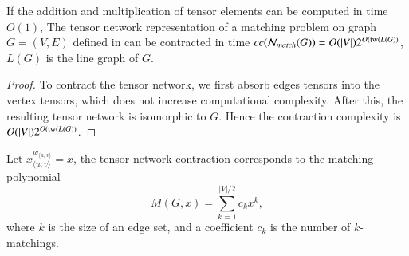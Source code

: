 \documentclass[review, onefignum, onetabnum]{siamart190516}
\begin{document}
\begin{theorem}\label{thm:matchcomplex}
    If the addition and multiplication of tensor elements can be computed in time $O(1)$,
    The tensor network representation of a matching problem on graph $G=(V,E)$ defined in  can be contracted in time $cc(\mathcal{N}_{match}(G)) = O(|V|)2^{O({\rm tw}(L(G))}$, $L(G)$ is the line graph of $G$.
\end{theorem}
\begin{proof}
    To contract the tensor network, we first absorb edges tensors into the vertex tensors, which does not increase computational complexity.
    After this, the resulting tensor network is isomorphic to $G$.
    Hence the contraction complexity is $O(|V|)2^{O({\rm tw}(L(G))}$.
\end{proof}
Let $x_{\langle u,v\rangle}^{w_{\langle u,v\rangle}}=x$, the tensor network contraction corresponds to the matching polynomial
\begin{equation}
    M(G, x) = \sum\limits_{k=1}^{|V|/2} c_k x^k,
\end{equation}
where $k$ is the size of an edge set, and a coefficient $c_k$ is the number of $k$-matchings.
\end{document}
